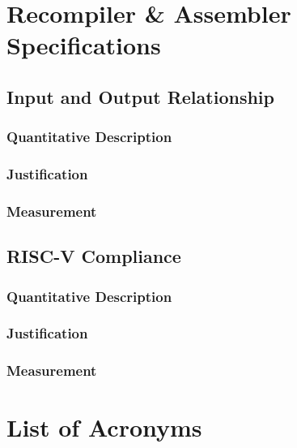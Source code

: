 \documentclass[11pt, oneside]{article}      %
\begin{document}
\section{Recompiler \& Assembler Specifications}
\subsection{Input and Output Relationship}
\subsubsection{Quantitative Description}
\subsubsection{Justification}
\subsubsection{Measurement}

\subsection{RISC-V Compliance}
\subsubsection{Quantitative Description}
\subsubsection{Justification}
\subsubsection{Measurement}

\section{List of Acronyms}



\clearpage



\end{document}
